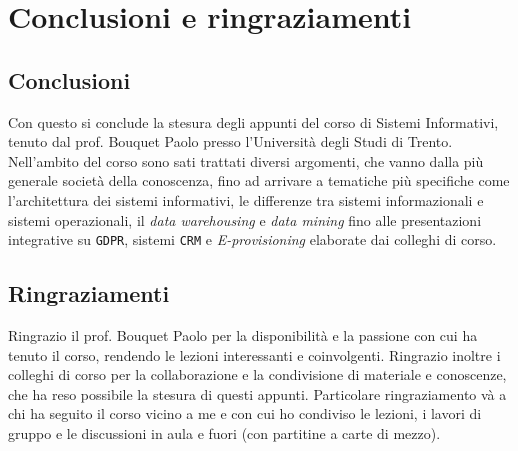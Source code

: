 \chapter*{Conclusioni e ringraziamenti}
\thispagestyle{chapterInit}

\section*{Conclusioni}
Con questo si conclude la stesura degli appunti del corso di Sistemi Informativi, tenuto dal prof. Bouquet Paolo presso l'Università degli Studi di Trento. Nell'ambito del corso sono sati trattati diversi argomenti, che vanno dalla più generale società della conoscenza, fino ad arrivare a tematiche più specifiche come l'architettura dei sistemi informativi, le differenze tra sistemi informazionali e sistemi operazionali, il \textit{data warehousing} e \textit{data mining} fino alle presentazioni integrative su \texttt{GDPR}, sistemi \texttt{CRM} e \textit{E-provisioning} elaborate dai colleghi di corso.

\section*{Ringraziamenti}
Ringrazio il prof. Bouquet Paolo per la disponibilità e la passione con cui ha tenuto il corso, rendendo le lezioni interessanti e coinvolgenti. Ringrazio inoltre i colleghi di corso per la collaborazione e la condivisione di materiale e conoscenze, che ha reso possibile la stesura di questi appunti. Particolare ringraziamento và a chi ha seguito il corso vicino a me e con cui ho condiviso le lezioni, i lavori di gruppo e le discussioni in aula e fuori (con partitine a carte di mezzo). 

